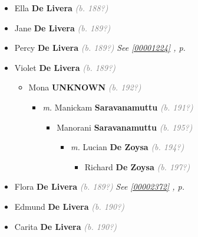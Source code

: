 \documentclass[10pt, openany]{book}
\begin{document}
\begin{itemize}
{\begin{itemize}
{\begin{itemize}
\end{itemize}
  }
\item{Ella \textbf{De Livera} \textcolor{gray}{\textit{(b. 188?)}}
  }
\item{Jane \textbf{De Livera} \textcolor{gray}{\textit{(b. 189?)}}
  }
\item{Percy \textbf{De Livera} \textcolor{gray}{\textit{(b. 189?)}} \textcolor{slteal}{\textit{See  \autoref{00001224} \textit{, p. \pageref{00001224} }}}}
\item{Violet \textbf{De Livera} \textcolor{gray}{\textit{(b. 189?)}}
\begin{itemize}
\item{Mona \textbf{UNKNOWN} \textcolor{gray}{\textit{(b. 192?)}}
\begin{itemize}
\item{\textit{m.} Manickam \textbf{Saravanamuttu} \textcolor{gray}{\textit{(b. 191?)}}   \label{couple:00002234:00002235} \begin{itemize}
\item{Manorani \textbf{Saravanamuttu} \textcolor{gray}{\textit{(b. 195?)}}
\begin{itemize}
\item{\textit{m.} Lucian \textbf{De Zoysa} \textcolor{gray}{\textit{(b. 194?)}}   \label{couple:00002236:00002237} \begin{itemize}
\item{Richard \textbf{De Zoysa} \textcolor{gray}{\textit{(b. 197?)}}
  }
\end{itemize}}
\end{itemize}
 }
\end{itemize}}
\end{itemize}
 }
\end{itemize}
  }
\item{Flora \textbf{De Livera} \textcolor{gray}{\textit{(b. 189?)}} \textcolor{slteal}{\textit{See  \autoref{00002372} \textit{, p. \pageref{00002372} }}}}
\item{Edmund \textbf{De Livera} \textcolor{gray}{\textit{(b. 190?)}}
  }
\item{Carita \textbf{De Livera} \textcolor{gray}{\textit{(b. 190?)}}
  }
\end{itemize}}
\end{itemize}
  
\end{document}

